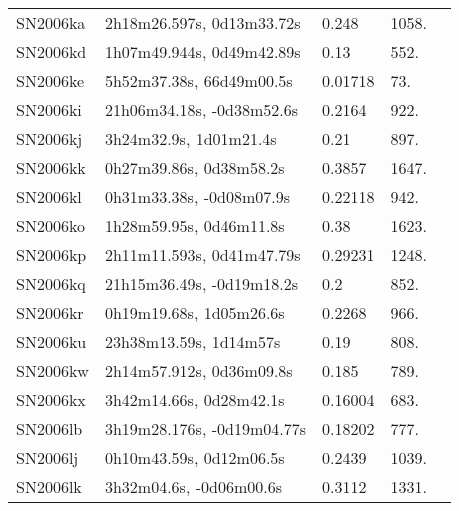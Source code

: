 \begin{longtable}{lllll}
         SN2006ka &      2h18m26.597s, 0d13m33.72s &    0.248 &          1058. &    \citet{2011ApJ...740...92G} \\
         SN2006kd &      1h07m49.944s, 0d49m42.89s &     0.13 &           552. &    \citet{2006CBET..680A...1B} \\
         SN2006ke &       5h52m37.38s, 66d49m00.5s &  0.01718 &            73. &    \citet{1991RC3.9.C...0000d} \\
         SN2006ki &      21h06m34.18s, -0d38m52.6s &   0.2164 &           922. &    \citet{2011ApJ...740...92G} \\
         SN2006kj &         3h24m32.9s, 1d01m21.4s &     0.21 &           897. &    \citet{2006CBET..688A...1B} \\
         SN2006kk &        0h27m39.86s, 0d38m58.2s &   0.3857 &          1647. &    \citet{2011ApJ...740...92G} \\
         SN2006kl &       0h31m33.38s, -0d08m07.9s &  0.22118 &           942. &    \citet{2016SDSSD.C...0000:} \\
         SN2006ko &        1h28m59.95s, 0d46m11.8s &     0.38 &          1623. &    \citet{2006CBET..688A...1B} \\
         SN2006kp &      2h11m11.593s, 0d41m47.79s &  0.29231 &          1248. &    \citet{2016SDSSD.C...0000:} \\
         SN2006kq &      21h15m36.49s, -0d19m18.2s &      0.2 &           852. &    \citet{2006CBET..688A...1B} \\
         SN2006kr &        0h19m19.68s, 1d05m26.6s &   0.2268 &           966. &    \citet{2011ApJ...740...92G} \\
         SN2006ku &         23h38m13.59s, 1d14m57s &     0.19 &           808. &    \citet{2006CBET..688A...1B} \\
         SN2006kw &       2h14m57.912s, 0d36m09.8s &    0.185 &           789. &    \citet{2011ApJ...740...92G} \\
         SN2006kx &        3h42m14.66s, 0d28m42.1s &  0.16004 &           683. &    \citet{2011ApJ...740...92G} \\
         SN2006lb &     3h19m28.176s, -0d19m04.77s &  0.18202 &           777. &    \citet{2011ApJ...740...92G} \\
         SN2006lj &        0h10m43.59s, 0d12m06.5s &   0.2439 &          1039. &    \citet{2011ApJ...740...92G} \\
         SN2006lk &        3h32m04.6s, -0d06m00.6s &   0.3112 &          1331. &    \citet{2011ApJ...740...92G} \\

\end{longtable}
